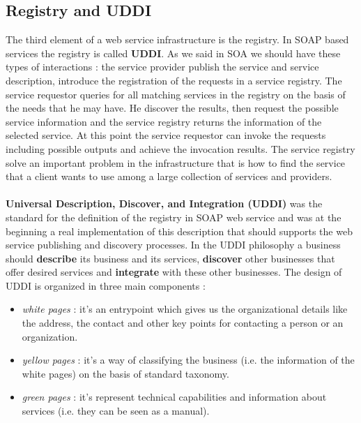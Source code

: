 \subsection{Registry and UDDI}
The third element of a web service infrastructure is the registry. In SOAP based services the registry is called \textbf{UDDI}. As we said in SOA we should have these types of interactions : the service provider publish the service and service description, introduce the registration of the requests in a service registry. The service requestor queries for all matching services in the registry on the basis of the needs that he may have. He discover the results, then request the possible service information and the service registry returns the information of the selected service. At this point the service requestor can invoke the requests including possible outputs and achieve the invocation results. The service registry solve an important problem in the infrastructure that is how to find the service that a client wants to use among a large collection of services and providers. \\\\\textbf{Universal Description, Discover, and Integration (UDDI)} was the standard for the definition of the registry in SOAP web service and was at the beginning a real implementation of this description that should supports the web service publishing and discovery processes. In the UDDI philosophy a business should \textbf{describe} its business and its services, \textbf{discover} other businesses that offer desired services and \textbf{integrate} with these other businesses. The design of UDDI is organized in three main components :
\begin{itemize}
    \item \textit{white pages} : it's an entrypoint which gives us the organizational details like the address, the contact and other key points for contacting a person or an organization.
    \item \textit{yellow pages} : it's a way of classifying the business (i.e. the information of the white pages) on the basis of standard taxonomy.
    \item \textit{green pages} : it's represent technical capabilities and information about services (i.e. they can be seen as a manual).
\end{itemize}
